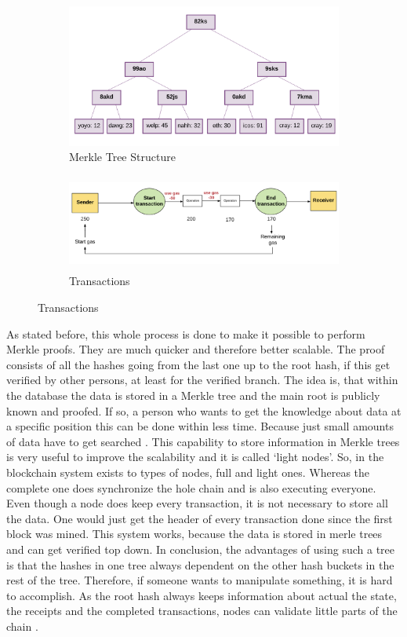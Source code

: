 \begin{figure}
  \caption{Ethereum Blockchain \cite{preethi}}
  \begin{subfigure}{0.5\textwidth}
    \centering
    \includegraphics[width=0.9\linewidth]{MerkleTree1.png}
    \caption{Merkle Tree Structure}
  \end{subfigure}%
  \begin{subfigure}{0.5\textwidth}
    \centering
    \includegraphics[width=0.7\linewidth, height=120px]{gastransactions.png}
  \caption{Transactions} 
  \end{subfigure}
\end{figure}

As stated before, this whole process is done to make it possible to perform Merkle proofs. 
They are much quicker and therefore better scalable. 
The proof consists of all the hashes going from the last one up to the root hash, if this get verified by other persons, at least for the verified branch. 
The idea is, that within the database the data is stored in a Merkle tree and the main root is publicly known and proofed. 
If so, a person who wants to get the knowledge about data at a specific position this can be done within less time. 
Because just small amounts of data have to get searched \cite{Buterin2015}.
This capability to store information in Merkle trees is very useful to improve the scalability and it is called ‘light nodes’. 
So, in the blockchain system exists to types of nodes, full and light ones. 
Whereas the complete one does synchronize the hole chain and is also executing everyone. 
Even though a node does keep every transaction, it is not necessary to store all the data. 
One would just get the header of every transaction done since the first block was mined. 
This system works, because the data is stored in merle trees and can get verified top down. 
In conclusion, the advantages of using such a tree is that the hashes in one tree always dependent on the other hash buckets in the rest of the tree. 
Therefore, if someone wants to manipulate something, it is hard to accomplish. 
As the root hash always keeps information about actual the state, the receipts and the completed transactions, nodes can validate little parts of the chain \cite{Kasireddz2017}.

